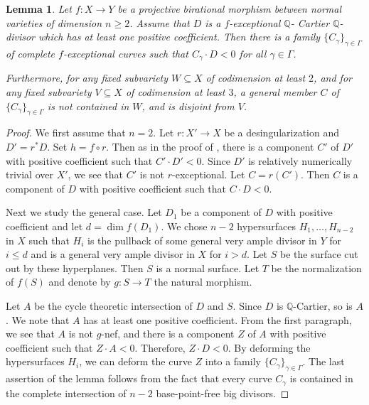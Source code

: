 \documentclass[english,reqno]{amsart}
\theoremstyle{plain}
\newtheorem{lemma}[thm]{Lemma}
\theoremstyle{definition}
\numberwithin{equation}{section} %
\begin{document}
\begin{lemma}
    \label{lemma:negativity-lemma-line-bundle}
    Let $f\colon X\to Y$ be a projective birational morphism between normal varieties of dimension $n\geqslant 2$.
    Assume that  $D$ is a $f$-exceptional $\mathbb{Q}$- Cartier $\mathbb{Q}$-divisor  which has at least one positive coefficient. Then  there is a family $\{C_\gamma\}_{\gamma\in \Gamma}$ of complete $f$-exceptional curves  such that $C_\gamma\cdot D<0$ for all $\gamma\in \Gamma$.

    Furthermore, for any fixed subvariety $W\subseteq X$ of codimension at least $2$, and for any fixed subvariety $V\subseteq X$ of codimension at least $3$,   a general member $C$ of $\{C_\gamma\}_{\gamma\in \Gamma}$ is not contained in $W$, and is disjoint from $V$.
\end{lemma}

\begin{proof}
    We first assume that $n=2$. Let $r\colon X'\to X$ be a desingularization and  $D'=r^*D$. Set $h=f\circ r$.
    Then as in the proof of \cite[Lemma 3.41]{KollarMori1998}, there is a component $C'$ of $D'$ with positive coefficient such that $C'\cdot D'<0$.
    Since $D'$ is relatively numerically trivial over $X'$, we see that $C'$ is not $r$-exceptional. Let $C=r(C')$.
    Then $C$ is a component of $D$ with positive coefficient such that $C\cdot D<0$.

    Next we study the general case. Let $D_1$ be a component of $D$ with positive coefficient and let  $d=\dim f(D_1)$. We chose $n-2$ hypersurfaces $H_1,\dots, H_{n-2}$ in $X$ such that $H_{i}$ is the pullback of some general very ample divisor in $Y$ for $i\le d$ and  is a general very ample divisor in $X$ for $i> d$. Let $S$  be the surface cut out by these hyperplanes.   Then $S$ is a normal surface. Let $T$ be the normalization of $f(S)$ and  denote by    $g \colon S\to T$ the natural morphism.

    Let $A$ be the cycle theoretic intersection of $D$ and $S$.  Since $D$ is $\mathbb{Q}$-Cartier, so is $A$. We note that $A$ has at least one positive coefficient.
      From the first paragraph, we see that $A$ is not $g$-nef, and there is a component $Z$ of $A$ with positive coefficient such that $Z\cdot A <0$. Therefore, $Z\cdot D<0$.    By  deforming  the hypersurfaces $H_i$, we can deform the curve $Z$ into  a family  $\{C_\gamma\}_{\gamma\in \Gamma}$.     The last assertion of the lemma follows from the fact that every curve  $C_\gamma$ is contained in the complete  intersection of $n-2$ base-point-free big divisors.
\end{proof}
\end{document}
